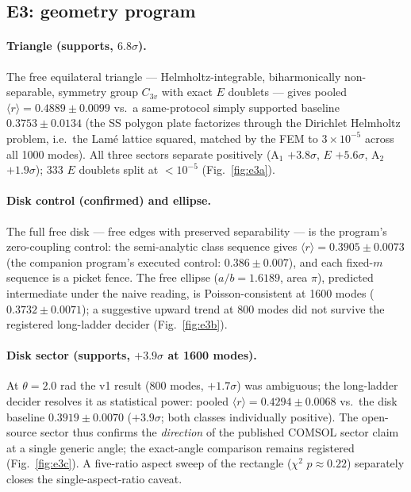 \documentclass[11pt]{article}
\newcommand{\rmean}{\langle r \rangle}
\begin{document}
\subsection{E3: geometry program}

\paragraph{Triangle (supports, $6.8\sigma$).} The free equilateral triangle
--- Helmholtz-integrable, biharmonically non-separable, symmetry group
$C_{3v}$ with exact $E$ doublets --- gives pooled $\rmean=0.4889\pm0.0099$
vs.\ a same-protocol simply supported baseline $0.3753\pm0.0134$ (the SS
polygon plate factorizes through the Dirichlet Helmholtz problem, i.e.\ the
Lam\'e lattice squared, matched by the FEM to $3\times10^{-5}$ across all
1000 modes). All three sectors separate positively (A$_1$ $+3.8\sigma$, $E$
$+5.6\sigma$, A$_2$ $+1.9\sigma$); 333 $E$ doublets split at
$<10^{-5}$ (Fig.~\ref{fig:e3a}).

\paragraph{Disk control (confirmed) and ellipse.} The full free disk ---
free edges with preserved separability --- is the program's zero-coupling
control: the semi-analytic class sequence gives
$\rmean=0.3905\pm0.0073$ (the companion program's executed control:
$0.386\pm0.007$), and each fixed-$m$ sequence is a picket fence. The free
ellipse ($a/b=1.6189$, area $\pi$), predicted intermediate under the naive
reading, is Poisson-consistent at 1600 modes ($0.3732\pm0.0071$); a
suggestive upward trend at 800 modes did not survive the registered
long-ladder decider (Fig.~\ref{fig:e3b}).

\paragraph{Disk sector (supports, $+3.9\sigma$ at 1600 modes).} At
$\theta=2.0$ rad the v1 result (800 modes, $+1.7\sigma$) was ambiguous; the
long-ladder decider resolves it as statistical power: pooled
$\rmean=0.4294\pm0.0068$ vs.\ the disk baseline $0.3919\pm0.0070$
($+3.9\sigma$; both classes individually positive). The open-source sector
thus confirms the \emph{direction} of the published COMSOL sector claim at
a single generic angle; the exact-angle comparison remains registered
(Fig.~\ref{fig:e3c}). A five-ratio aspect sweep of the rectangle
($\chi^2$ $p\approx0.22$) separately closes the single-aspect-ratio caveat.
\end{document}
